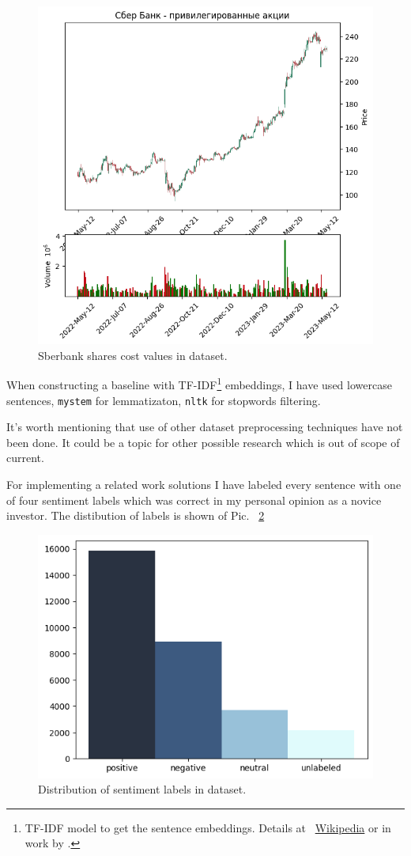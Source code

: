 \documentclass{article}
\begin{document}
\begin{figure}[!tbh]
    \centering
    \includegraphics[width=0.9\linewidth]{sber.png}
    \caption{Sberbank shares cost values in dataset.}
    \label{fig:sber}
\end{figure}

When constructing a baseline with TF-IDF\footnote{TF-IDF model to get the sentence embeddings. Details at ~\href{https://ru.wikipedia.org/wiki/TF-IDF}{Wikipedia} or in work by \cite{Ramos1999}.} embeddings, I have used lowercase sentences, \texttt{mystem} for lemmatizaton, \texttt{nltk} for stopwords filtering.

It's worth mentioning that use of other dataset preprocessing techniques have not been done. It could be a topic for other possible research which is out of scope of current.

For implementing a related work solutions I have labeled every sentence with one of four sentiment labels which was correct in my personal opinion as a novice investor. The distibution of labels is shown of Pic. ~\ref{fig:labels}

\begin{figure}[!tbh]
    \centering
    \includegraphics[width=0.5\linewidth]{labels.png}
    \caption{Distribution of sentiment labels in dataset.}
    \label{fig:labels}
\end{figure}
\end{document}
